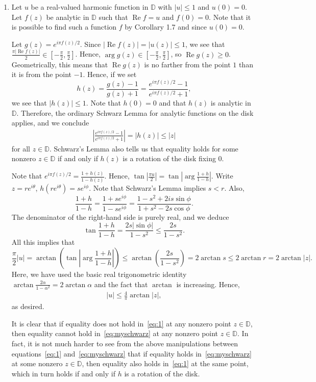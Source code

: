 \documentclass[11pt]{book}
\theoremstyle{definition}
\renewcommand{\Re}{\operatorname{Re}}
\begin{document}
\begin{enumerate}
  \item Let $u$ be a real-valued harmonic function in $\mathbb D$ with $|u| \leq 1$ and $u(0) = 0$.  Let $f(z)$ be analytic in $\mathbb D$ such that $\Re f = u$ and $f(0) = 0$.  Note that it is possible to find such a function $f$ by Corollary 1.7 and since $u(0) = 0$.  
    
    Let $g(z) = e^{i\pi f(z) / 2}$. Since $|\Re f(z)| = |u(z)| \leq 1$, we see that $\tfrac{\pi |\Re f(z)|}{2} \in [- \tfrac \pi 2, \tfrac \pi 2]$.  Hence, $\arg g(z) \in [-\tfrac \pi 2, \tfrac \pi 2]$, so $\Re g(z) \geq  0$.  Geometrically, this means that $\Re g(z)$ is no farther from the point $1$ than it is from the point $-1$.  Hence, if we set
    \[ h(z) = \frac{g(z) - 1}{g(z) + 1} = \frac{e^{i\pi f(z)/2} - 1}{e^{i\pi f(z)/2} + 1},  \]   we see that $|h(z)| \leq 1$.   Note that $h(0) = 0$ and that $h(z)$ is analytic in $\mathbb D$.  Therefore, the ordinary Schwarz Lemma for analytic functions on the disk applies, and we conclude 
    \begin{align}
      \left| \frac{e^{i\pi f(z)/2} - 1}{e^{i\pi f(z)/ 2} + 1} \right|    
      = |h(z)| 
      \leq |z|  \label{eq:1}
    \end{align} 
    for all $z\in \mathbb D$.  Schwarz's Lemma also tells us that equality holds for some nonzero $z\in \mathbb D$ if and only if $h(z)$ is a rotation of the disk fixing $0$. 

    Note that $e^{i\pi f(z)/2} = \frac{1+h(z)}{1-h(z)}$.  Hence, $\tan |\frac{\pi u}{2} | = \tan | \arg \frac{1+h}{1-h} |$.  Write $z=re^{i\theta}$, $h(re^{i\theta}) = se^{i\phi}$.  Note that Schwarz's Lemma implies $s < r$.  Also,
    \[ \frac{1+h}{1-h} = \frac{1+se^{i\phi}}{1-se^{i\phi}} = \frac{1-s^2 + 2is \sin \phi}{1 + s^2 - 2s \cos \phi}. \] The denominator of the right-hand side is purely real, and we deduce 
    \[ \tan \frac{1+h}{1-h} = \frac{2s |\sin \phi|}{1-s^2} \leq \frac{2s}{1-s^2}. \]  All this implies that 
    \[ \frac \pi 2 |u| = \arctan ( \tan | \arg \frac{1+h}{1-h} | ) \leq \arctan(\frac{2s}{1-s^2} ) = 2 \arctan s \leq 2 \arctan r = 2 \arctan |z|. \]  Here, we have used the basic real trigonometric identity  $\arctan \frac{2 \alpha}{1-\alpha^2} = 2 \arctan \alpha$ and the fact that $\arctan$ is increasing.   Hence, 
    \begin{align}
      |u| \leq  \frac{4}{\pi} \arctan |z|,  \label{eq:myschwarz}
    \end{align} as desired. 

    It is clear that if equality does not hold in~\eqref{eq:1} at any nonzero point $z\in \mathbb D$, then equality cannot hold in~\eqref{eq:myschwarz} at any nonzero point $z\in \mathbb D$.  In fact, it is not much harder to see from the above manipulations between equations~\eqref{eq:1} and~\eqref{eq:myschwarz} that if equality holds in~\eqref{eq:myschwarz} at some nonzero $z\in \mathbb D$, then equality also holds in~\eqref{eq:1} at the same point, which in turn holds if and only if $h$ is a rotation of the disk.  




\end{enumerate}
\end{document}
